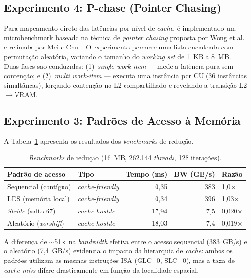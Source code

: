 
\subsection{Experimento 4: P-chase (Pointer Chasing)}

Para mapeamento direto das latências por nível de \textit{cache}, é implementado um microbenchmark baseado na técnica de \textit{pointer chasing} proposta por Wong et al.~\cite{wong2010} e refinada por Mei e Chu~\cite{mei2017}. O experimento percorre uma lista encadeada com permutação aleatória, variando o tamanho do \textit{working set} de 1~KB a 8~MB. Duas fases são conduzidas: (1)~\textit{single work-item} --- mede a latência pura sem contenção; e (2)~\textit{multi work-item} --- executa uma instância por CU (36 instâncias simultâneas), forçando contenção no L2 compartilhado e revelando a transição L2$\to$VRAM.


\subsection{Experimento 3: Padrões de Acesso à Memória}

A Tabela~\ref{tab:access} apresenta os resultados dos \textit{benchmarks} de redução.

\begin{table}[ht]
\centering
\caption{\textit{Benchmarks} de redução (16~MB, 262.144 \textit{threads}, 128 iterações).}
\label{tab:access}
\small
\begin{tabular}{@{}llrrl@{}}
\toprule
\textbf{Padrão de acesso} & \textbf{Tipo} & \textbf{Tempo (ms)} & \textbf{BW (GB/s)} & \textbf{Razão} \\
\midrule
Sequencial (contíguo) & \textit{cache-friendly} & 0,35 & 383 & 1,0$\times$ \\
LDS (memória local) & \textit{cache-friendly} & 0,34 & 396 & 1,03$\times$ \\
\textit{Stride} (salto 67) & \textit{cache-hostile} & 17,94 & 7,5 & 0,020$\times$ \\
Aleatório (\textit{xorshift}) & \textit{cache-hostile} & 18,03 & 7,4 & 0,019$\times$ \\
\bottomrule
\end{tabular}
\end{table}

A diferença de $\sim$51$\times$ na \textit{bandwidth} efetiva entre o acesso sequencial (383~GB/s) e o aleatório (7,4~GB/s) evidencia o impacto da hierarquia de \textit{cache}: ambos os padrões utilizam as mesmas instruções ISA (GLC=0, SLC=0), mas a taxa de \textit{cache miss} difere drasticamente em função da localidade espacial.

